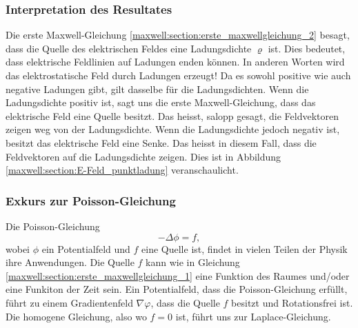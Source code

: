 \subsubsection{Interpretation des Resultates}
Die erste Maxwell-Gleichung \eqref{maxwell:section:erste_maxwellgleichung_2} besagt, dass die Quelle des elektrischen Feldes eine Ladungsdichte $\varrho$ ist.
Dies bedeutet, dass elektrische Feldlinien auf Ladungen enden können.
In anderen Worten wird das elektrostatische Feld durch Ladungen erzeugt!
Da es sowohl positive wie auch negative Ladungen gibt, gilt dasselbe für die Ladungsdichten.
Wenn die Ladungsdichte positiv ist, sagt uns die erste Maxwell-Gleichung, dass das elektrische Feld eine Quelle besitzt.
Das heisst, salopp gesagt, die Feldvektoren zeigen weg von der Ladungsdichte.
Wenn die Ladungsdichte jedoch negativ ist, besitzt das elektrische Feld eine Senke.
Das heisst in diesem Fall, dass die Feldvektoren auf die Ladungsdichte zeigen. Dies ist in Abbildung \ref{maxwell:section:E-Feld_punktladung} veranschaulicht.

\subsubsection{Exkurs zur Poisson-Gleichung}
Die Poisson-Gleichung
\[
-\Delta\phi
=
f,
\]
wobei $\phi$ ein Potentialfeld und $f$ eine Quelle ist, findet in vielen Teilen der Physik ihre Anwendungen.
Die Quelle $f$ kann wie in Gleichung \eqref{maxwell:section:erste_maxwellgleichung_1} eine Funktion des Raumes und/oder eine Funkiton der Zeit sein.
Ein Potentialfeld, dass die Poisson-Gleichung erfüllt, führt zu einem Gradientenfeld $\nabla\varphi$, dass die Quelle $f$ besitzt und Rotationsfrei ist.
Die homogene Gleichung, also wo $f = 0$ ist, führt uns zur Laplace-Gleichung.







